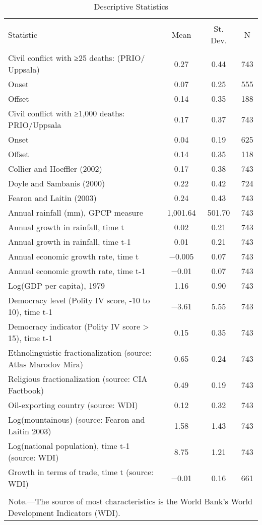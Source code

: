 
\begin{table}[!htbp] \centering 
  \caption{Descriptive Statistics} 
  \label{} 
\begin{tabular}{@{\extracolsep{5pt}}lccc} 
\\[-1.8ex]\hline 
\hline \\[-1.8ex] 
Statistic & \multicolumn{1}{c}{Mean} & \multicolumn{1}{c}{St. Dev.} & \multicolumn{1}{c}{N} \\ 
\hline \\[-1.8ex] 
Civil conflict with ≥25 deaths: (PRIO/
Uppsala) & 0.27 & 0.44 & 743 \\ 
Onset & 0.07 & 0.25 & 555 \\ 
Offset & 0.14 & 0.35 & 188 \\ 
Civil conflict with ≥1,000 deaths:
PRIO/Uppsala & 0.17 & 0.37 & 743 \\ 
Onset & 0.04 & 0.19 & 625 \\ 
Offset & 0.14 & 0.35 & 118 \\ 
Collier and Hoeffler (2002) & 0.17 & 0.38 & 743 \\ 
Doyle and Sambanis (2000) & 0.22 & 0.42 & 724 \\ 
Fearon and Laitin (2003) & 0.24 & 0.43 & 743 \\ 
Annual rainfall (mm), GPCP measure & 1,001.64 & 501.70 & 743 \\ 
Annual growth in rainfall, time t & 0.02 & 0.21 & 743 \\ 
Annual growth in rainfall, time t-1 & 0.01 & 0.21 & 743 \\ 
Annual economic growth rate, time t & $-$0.005 & 0.07 & 743 \\ 
Annual economic growth rate, time t-1 & $-$0.01 & 0.07 & 743 \\ 
Log(GDP per capita), 1979 & 1.16 & 0.90 & 743 \\ 
Democracy level (Polity IV score, -10 to 10), time t-1 & $-$3.61 & 5.55 & 743 \\ 
Democracy indicator (Polity IV score > 15),
time t-1 & 0.15 & 0.35 & 743 \\ 
Ethnolinguistic fractionalization (source:
Atlas Marodov Mira) & 0.65 & 0.24 & 743 \\ 
Religious fractionalization (source: CIA
Factbook) & 0.49 & 0.19 & 743 \\ 
Oil-exporting country (source: WDI) & 0.12 & 0.32 & 743 \\ 
Log(mountainous) (source: Fearon and
Laitin 2003) & 1.58 & 1.43 & 743 \\ 
Log(national population), time t-1
(source: WDI) & 8.75 & 1.21 & 743 \\ 
Growth in terms of trade, time t (source:
WDI) & $-$0.01 & 0.16 & 661 \\ 
\hline \\[-1.8ex] 
\multicolumn{4}{l}{Note.—The source of most characteristics is the World Bank’s World Development Indicators (WDI).} \\ 
\end{tabular} 
\end{table} 
